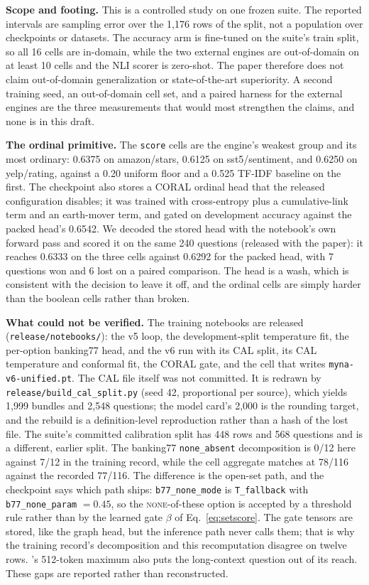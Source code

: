 \textbf{Scope and footing.}
This is a controlled study on one frozen suite. The reported intervals are sampling error over the
1{,}176 rows of the split, not a population over checkpoints or datasets. The accuracy arm is
fine-tuned on the suite's train split, so all 16 cells are in-domain, while the two external
engines are out-of-domain on at least 10 cells and the NLI scorer is zero-shot. The paper
therefore does not claim out-of-domain generalization or state-of-the-art superiority. A second
training seed, an out-of-domain cell set, and a paired harness for the external engines are the
three measurements that would most strengthen the claims, and none is in this draft.

\textbf{The ordinal primitive.}
The \texttt{score} cells are the engine's weakest group and its most ordinary: 0.6375 on
amazon/stars, 0.6125 on sst5/sentiment, and 0.6250 on yelp/rating, against a 0.20 uniform floor and
a 0.525 TF-IDF baseline on the first. The checkpoint also stores a CORAL \citep{cao2020coral} ordinal head that the
released configuration disables; it was trained with cross-entropy plus a cumulative-link term and
an earth-mover term, and gated on development accuracy against the packed head's 0.6542. We decoded
the stored head with the notebook's own forward pass and scored it on the same 240 questions
(released with the paper): it reaches 0.6333 on the three cells against 0.6292 for the packed
head, with 7 questions won and 6 lost on a paired comparison. The head is a wash, which is
consistent with the decision to leave it off, and the ordinal cells are simply harder
than the boolean cells rather than broken.

\textbf{What could not be verified.}
The training notebooks are released (\texttt{release/notebooks/}): the v5 loop, the
development-split temperature fit, the per-option banking77 head, and the v6 run with its CAL
split, its CAL temperature and conformal fit, the CORAL gate, and the cell that writes
\texttt{myna-v6-unified.pt}. The CAL file itself was not committed. It is redrawn by
\texttt{release/build\_cal\_split.py} (seed 42, proportional per source), which yields 1{,}999
bundles and 2{,}548 questions; the model card's 2{,}000 is the rounding target, and the rebuild is
a definition-level reproduction rather than a hash of the lost file. The suite's committed
calibration split has 448 rows and 568 questions and is a different, earlier split. The banking77 \texttt{none\_absent} decomposition is 0/12 here against 7/12 in the
training record, while the cell aggregate matches at 78/116 against the recorded 77/116. The
difference is the open-set path, and the checkpoint says which path ships:
\texttt{b77\_none\_mode} is \texttt{T\_fallback} with \texttt{b77\_none\_param} $=0.45$, so the
\textsc{none}-of-these option is accepted by a threshold rule rather than by the learned gate
$\beta$ of Eq.~\eqref{eq:setscore}. The gate tensors are stored, like the graph head, but the
inference path never calls them; that is why the training record's decomposition and this
recomputation disagree on twelve rows.
\vsix{}'s 512-token maximum also puts the long-context question out of its reach. These gaps are
reported rather than reconstructed.

